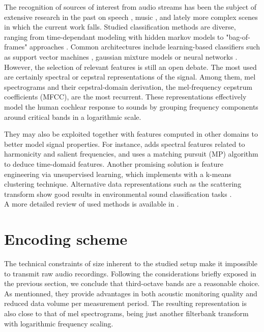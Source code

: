 \documentclass[final,3p,times,twocolumn]{elsarticle}
\begin{document}
The recognition of sources of interest from audio streams has been the subject of extensive research in the past on speech \cite{anusuya2009}, music \cite{tzanetakis2002}, and lately more complex scenes in which the current work falls. Studied classification methods are diverse, ranging from time-dependant modeling with hidden markov models \cite{ntalampiras2014} to "bag-of-frames" approaches \cite{aucouturier2007, foggia2015}. Common architectures include learning-based classifiers such as support vector machines \cite{kumar2016}, gaussian mixture models \cite{radhakrishnan2005} or neural networks \cite{salamon2017, piczak2015}. However, the selection of relevant features is still an open debate. The most used are certainly spectral \cite{khunarsal2013} or cepstral \cite{couvreur2004} representations of the signal. Among them, mel spectrograms and their cepstral-domain derivation, the mel-frequency cepstrum coefficients (MFCC), are the most recurrent. These representations effectively model the human cochlear response to sounds by grouping frequency components around critical bands in a logarithmic scale.

They may also be exploited together with features computed in other domains to better model signal properties. For instance, \cite{cai2006} adds spectral features related to harmonicity and salient frequencies, and \cite{chu2009} uses a matching pursuit (MP) algorithm to deduce time-domaid features. Another promising solution is feature engineering via unsupervised learning, which \cite{salamon2015-2} implements with a k-means clustering technique. Alternative data representations such as the scattering transform \cite{bauge2013} show good results in environmental sound classification tasks \cite{salamon2015}.\\
A more detailed review of used methods is available in \cite{chachada2013}.

\section{Encoding scheme} \label{sec:coder}

The technical constraints of size inherent to the studied setup make it impossible to transmit raw audio recordings. Following the considerations briefly exposed in the previous section, we conclude that third-octave bands are a reasonable choice. As mentionned, they provide advantages in both acoustic monitoring quality and reduced data volume per measurement period. The resulting representation is also close to that of mel spectrograms, being just another filterbank transform with logarithmic frequency scaling.\\
\end{document}
